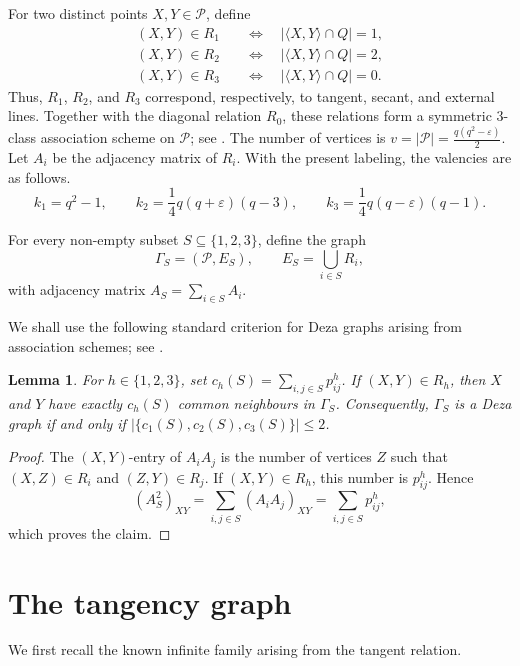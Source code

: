 \documentclass{article}
\theoremstyle{plain}
\newtheorem{lem}[thm]{Lemma}
\begin{document}
For two distinct points $X,Y\in\mathcal P$, define
\[
\begin{aligned}
 (X,Y)\in R_1
 &\quad\Longleftrightarrow\quad
 |\langle X,Y\rangle\cap Q|=1,\\
 (X,Y)\in R_2
 &\quad\Longleftrightarrow\quad
 |\langle X,Y\rangle\cap Q|=2,\\
 (X,Y)\in R_3
 &\quad\Longleftrightarrow\quad
 |\langle X,Y\rangle\cap Q|=0.
\end{aligned}
\]
Thus, $R_1$, $R_2$, and $R_3$ correspond, respectively, to tangent, secant, and external lines. Together with the diagonal relation $R_0$, these relations form a symmetric $3$-class association scheme on $\mathcal{P}$; see \cite{AdriaensenDeBoeck2025}. The number of vertices is $v=|\mathcal{P}|=\frac{q(q^2-\varepsilon)}{2}$. Let $A_i$ be the adjacency matrix of $R_i$. With the present labeling, the valencies are as follows. \begin{equation}\label{eq:valencies}
 k_1=q^2-1,\qquad
 k_2=\frac14q(q+\varepsilon)(q-3),\qquad
 k_3=\frac14q(q-\varepsilon)(q-1).
\end{equation}

For every non-empty subset $S\subseteq\{1,2,3\}$, define the graph
\[
 \Gamma_S=(\mathcal{P},E_S),
 \qquad
 E_S=\bigcup_{i\in S}R_i,
\]
with adjacency matrix $A_S=\sum_{i\in S}A_i$.

We shall use the following standard criterion for Deza graphs arising
from association schemes; see \cite[Theorem~4.2]{EricksonEtAl1999}.

\begin{lem}\label{lem:deza-criterion}
For $h\in\{1,2,3\}$, set $c_h(S)=\sum_{i,j\in S}p_{ij}^h$. If $(X,Y)\in R_h$, then $X$ and $Y$ have exactly $c_h(S)$ common neighbours in $\Gamma_S$. Consequently, $\Gamma_S$ is a Deza graph if and only if $|\{c_1(S),c_2(S),c_3(S)\}|\leq2$.
\end{lem}

\begin{proof}
The $(X,Y)$-entry of $A_iA_j$ is the number of vertices $Z$ such that $(X,Z)\in R_i$ and $(Z,Y)\in R_j$.  If $(X,Y)\in R_h$, this number is
$p_{ij}^{h}$. Hence \[
 (A_S^2)_{XY}
 =\sum_{i,j\in S}(A_iA_j)_{XY}
 =\sum_{i,j\in S}p_{ij}^{h},
\]
which proves the claim.
\end{proof}

\section{The tangency graph}
We first recall the known infinite family arising from the tangent relation.
\end{document}
